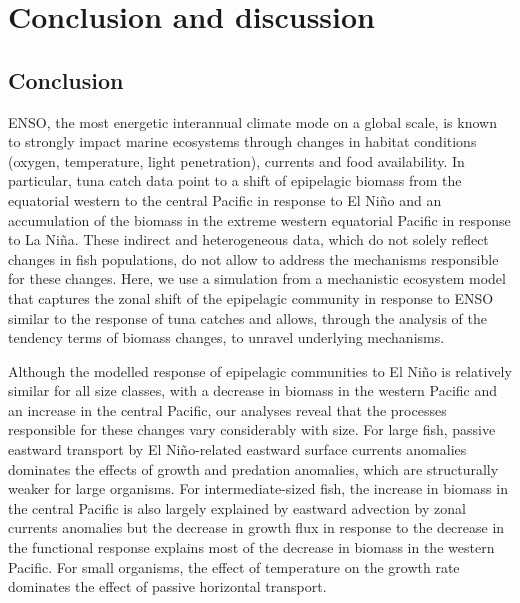 
\section{Conclusion and discussion}
\label{sec:conclusion}


\subsection{Conclusion}

ENSO, the most energetic interannual climate mode on a  global scale, is known to strongly impact marine ecosystems through changes in habitat conditions (oxygen, temperature, light penetration), currents and food availability. In particular, tuna catch data point to a shift of epipelagic biomass from the equatorial western to the central Pacific in response to El Niño and an accumulation of the biomass in the extreme western equatorial Pacific in response to La Niña. These indirect and heterogeneous data, which do not solely reflect changes in fish populations, do not allow to address the mechanisms responsible for these changes. Here, we use a simulation from a mechanistic ecosystem model that captures the zonal shift of the epipelagic community in response to ENSO similar to the response of tuna catches and allows, through the analysis of the tendency terms of biomass changes, to unravel underlying mechanisms.

Although the modelled response of epipelagic communities to El Niño is relatively similar for all size classes, with a decrease in biomass in the western Pacific and an increase in the central Pacific, our analyses reveal that the processes responsible for these changes vary considerably with size. For large fish, passive eastward transport by El Niño-related eastward surface currents anomalies dominates the effects of growth and predation anomalies, which are structurally weaker for large organisms. For intermediate-sized fish, the increase in biomass in the central Pacific is also largely explained by eastward advection by zonal currents anomalies but the decrease in growth flux in response to the decrease in the functional response explains most of the decrease in biomass in the western Pacific. For small organisms, the effect of temperature on the growth rate dominates the effect of passive horizontal transport.


